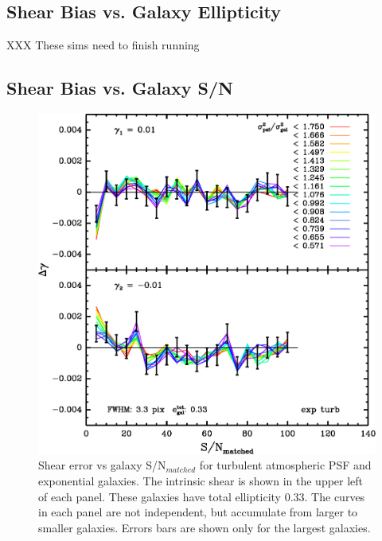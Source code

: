 \documentclass[12pt,preprint]{aastex}
\begin{document}
\subsection{Shear Bias vs. Galaxy Ellipticity}


XXX These sims need to finish running



\subsection{Shear Bias vs. Galaxy S/N}

\begin{figure}[t] \centering \centering
\includegraphics[scale=0.7]{figures/gmix-fit-et03r01-yr-0.005-0.005-diff-cum.eps}

 \caption{Shear error vs galaxy S/N$_{matched}$ for turbulent atmospheric PSF
 and exponential galaxies. The intrinsic shear is shown in the upper left of
 each panel.  These galaxies have total ellipticity 0.33.  The curves in each
 panel are not independent, but accumulate from larger to smaller galaxies.
 Errors bars are shown only for the largest galaxies.
 \label{fig:et03r01}}

\end{figure}
\end{document}
